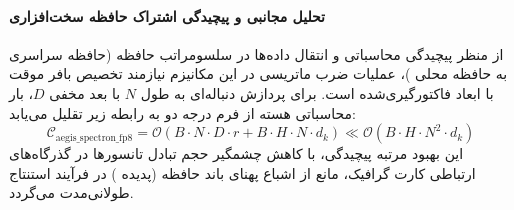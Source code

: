 \paragraph{تحلیل مجانبی و پیچیدگی اشتراک حافظه سخت‌افزاری}
از منظر پیچیدگی محاسباتی و انتقال داده‌ها در سلسومراتب حافظه (حافظه سراسری  به حافظه محلی )، عملیات ضرب ماتریسی در این مکانیزم نیازمند تخصیص بافر موقت با ابعاد فاکتورگیری‌شده است. برای پردازش دنباله‌ای به طول $N$ با بعد مخفی $D$، بار محاسباتی هسته از فرم درجه دو به رابطه زیر تقلیل می‌یابد:
\begin{equation}
\label{eq:complexity_aegis_spectron_fp8}
\mathcal{C}_{\text{aegis\_spectron\_fp8}} = \mathcal{O}\left( B \cdot N \cdot D \cdot r + B \cdot H \cdot N \cdot d_k \right) \ll \mathcal{O}\left( B \cdot H \cdot N^2 \cdot d_k \right)
\end{equation}
این بهبود مرتبه پیچیدگی، با کاهش چشمگیر حجم تبادل تانسورها در گذرگاه‌های ارتباطی کارت گرافیک، مانع از اشباع پهنای باند حافظه (پدیده ) در فرآیند استنتاج طولانی‌مدت می‌گردد.
